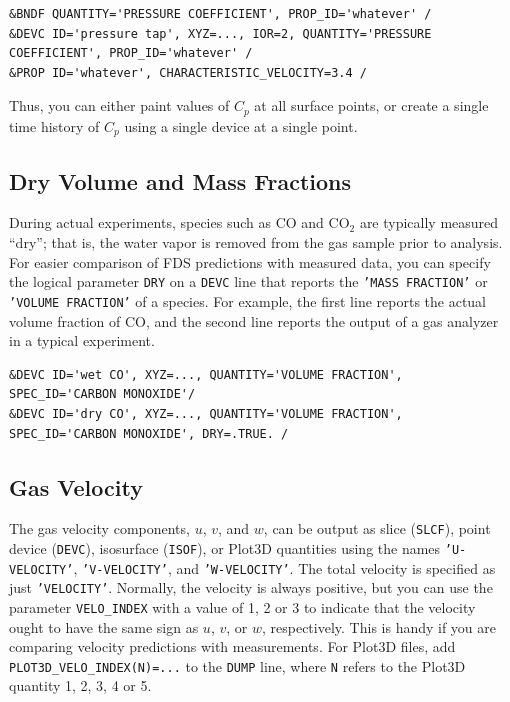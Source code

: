 \documentclass[11pt]{book}
\newcommand{\ct}{\tt\small}
\begin{document}
\footnotesize
\begin{verbatim}
&BNDF QUANTITY='PRESSURE COEFFICIENT', PROP_ID='whatever' /
&DEVC ID='pressure tap', XYZ=..., IOR=2, QUANTITY='PRESSURE COEFFICIENT', PROP_ID='whatever' /
&PROP ID='whatever', CHARACTERISTIC_VELOCITY=3.4 /
\end{verbatim}
\normalsize

\noindent
Thus, you can either paint values of $C_p$ at all surface points, or create a single time history of $C_p$ using a single device at a single point.

\subsection{Dry Volume and Mass Fractions}
\label{info:dry}

During actual experiments, species such as CO and CO$_2$ are typically measured ``dry''; that is, the water
vapor is removed from the gas sample prior to analysis.  For easier comparison of FDS predictions with measured data,
you can specify the logical parameter {\ct DRY} on a {\ct DEVC} line that reports the {\ct 'MASS FRACTION'} or
{\ct 'VOLUME FRACTION'} of a species.  For example, the first line reports
the actual volume fraction of CO, and the second line reports the output of a gas analyzer in a typical experiment.

\footnotesize
\begin{verbatim}
&DEVC ID='wet CO', XYZ=..., QUANTITY='VOLUME FRACTION', SPEC_ID='CARBON MONOXIDE'/
&DEVC ID='dry CO', XYZ=..., QUANTITY='VOLUME FRACTION', SPEC_ID='CARBON MONOXIDE', DRY=.TRUE. /
\end{verbatim}
\normalsize


\subsection{Gas Velocity}
\label{info:velocity}

The gas velocity components, $u$, $v$, and $w$, can be output as slice ({\ct SLCF}), point device ({\ct DEVC}), isosurface ({\ct ISOF}), or Plot3D quantities using
the names {\ct 'U-VELOCITY'}, {\ct 'V-VELOCITY'}, and {\ct 'W-VELOCITY'}.
The total velocity is specified as just {\ct 'VELOCITY'}. Normally, the velocity is always positive, but you can use the parameter {\ct VELO\_INDEX} with a value
of 1, 2 or 3 to indicate that the velocity ought to have the same sign as $u$, $v$, or $w$, respectively. This is handy if you are comparing velocity predictions
with measurements. For Plot3D files, add {\ct PLOT3D\_VELO\_INDEX(N)=...} to the {\ct DUMP} line, where {\ct N} refers to the Plot3D quantity 1, 2, 3, 4 or 5.
\end{document}
